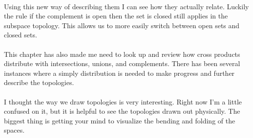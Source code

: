 \documentclass[10pt]{article}
\begin{document}
\\
Using this new way of describing them I can see how they actually relate. Luckily the rule if the complement is open then the set is closed still applies in the subspace topology. This allows us to more easily switch between open sets and closed sets.\\
\\
This chapter has also made me need to look up and review how cross products distribute with intersections, unions, and complements. There has been several instances where a simply distribution is needed to make progress and further describe the topologies.\\
\\
I thought the way we draw topologies is very interesting. Right now I'm a little confused on it, but it is helpful to see the topologies drawn out physically. The biggest thing is getting your mind to visualize the bending and folding of the spaces.
\end{document}
